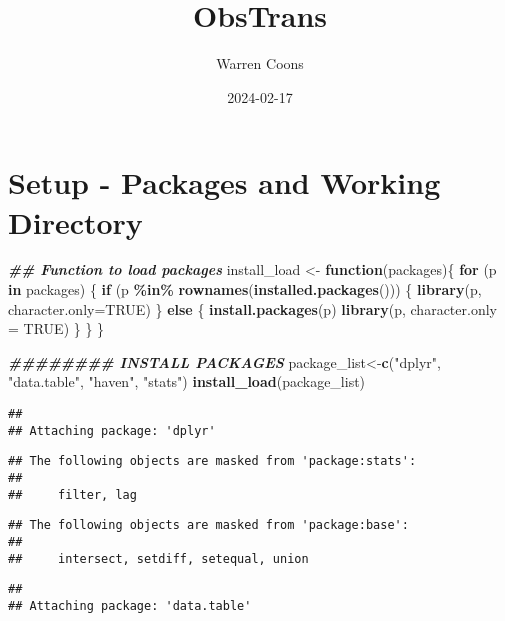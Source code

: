 \documentclass[
]{article}
\title{ObsTrans}
\author{Warren Coons}
\date{2024-02-17}
\newenvironment{Shaded}{\begin{snugshade}}{\end{snugshade}}
\newcommand{\AttributeTok}[1]{\textcolor[rgb]{0.13,0.29,0.53}{#1}}
\newcommand{\ConstantTok}[1]{\textcolor[rgb]{0.56,0.35,0.01}{#1}}
\newcommand{\ControlFlowTok}[1]{\textcolor[rgb]{0.13,0.29,0.53}{\textbf{#1}}}
\newcommand{\DocumentationTok}[1]{\textcolor[rgb]{0.56,0.35,0.01}{\textbf{\textit{#1}}}}
\newcommand{\FunctionTok}[1]{\textcolor[rgb]{0.13,0.29,0.53}{\textbf{#1}}}
\newcommand{\NormalTok}[1]{#1}
\newcommand{\OtherTok}[1]{\textcolor[rgb]{0.56,0.35,0.01}{#1}}
\newcommand{\SpecialCharTok}[1]{\textcolor[rgb]{0.81,0.36,0.00}{\textbf{#1}}}
\newcommand{\StringTok}[1]{\textcolor[rgb]{0.31,0.60,0.02}{#1}}
\begin{document}
\maketitle

\section{Setup - Packages and Working
Directory}\label{setup---packages-and-working-directory}

\begin{Shaded}
\begin{Highlighting}[]
\DocumentationTok{\#\# Function to load packages }
\NormalTok{install\_load }\OtherTok{\textless{}{-}} \ControlFlowTok{function}\NormalTok{(packages)\{}
  \ControlFlowTok{for}\NormalTok{ (p }\ControlFlowTok{in}\NormalTok{ packages) \{}
    \ControlFlowTok{if}\NormalTok{ (p }\SpecialCharTok{\%in\%} \FunctionTok{rownames}\NormalTok{(}\FunctionTok{installed.packages}\NormalTok{())) \{}
      \FunctionTok{library}\NormalTok{(p, }\AttributeTok{character.only=}\ConstantTok{TRUE}\NormalTok{)}
\NormalTok{    \} }\ControlFlowTok{else}\NormalTok{ \{}
      \FunctionTok{install.packages}\NormalTok{(p)}
      \FunctionTok{library}\NormalTok{(p, }\AttributeTok{character.only =} \ConstantTok{TRUE}\NormalTok{)}
\NormalTok{    \}}
\NormalTok{  \}}
\NormalTok{\}}

\DocumentationTok{\#\#\#\#\#\#\#\# INSTALL PACKAGES}
\NormalTok{package\_list}\OtherTok{\textless{}{-}}\FunctionTok{c}\NormalTok{(}\StringTok{"dplyr"}\NormalTok{, }\StringTok{"data.table"}\NormalTok{, }\StringTok{"haven"}\NormalTok{, }\StringTok{"stats"}\NormalTok{)}
\FunctionTok{install\_load}\NormalTok{(package\_list)}
\end{Highlighting}
\end{Shaded}

\begin{verbatim}
## 
## Attaching package: 'dplyr'
\end{verbatim}

\begin{verbatim}
## The following objects are masked from 'package:stats':
## 
##     filter, lag
\end{verbatim}

\begin{verbatim}
## The following objects are masked from 'package:base':
## 
##     intersect, setdiff, setequal, union
\end{verbatim}

\begin{verbatim}
## 
## Attaching package: 'data.table'
\end{verbatim}
\end{document}
